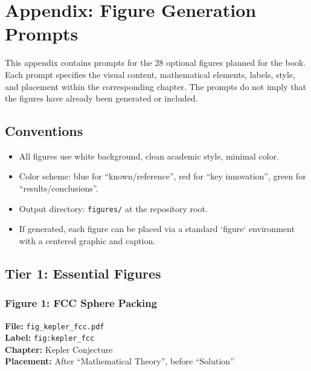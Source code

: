 \chapter*{Appendix: Figure Generation Prompts}

This appendix contains prompts for the 28 optional figures planned for the book. Each prompt specifies the visual content, mathematical elements, labels, style, and placement within the corresponding chapter. The prompts do not imply that the figures have already been generated or included.

\section*{Conventions}
\begin{itemize}
\item All figures use white background, clean academic style, minimal color.
\item Color scheme: blue for ``known/reference'', red for ``key innovation'', green for ``results/conclusions''.
\item Output directory: \texttt{figures/} at the repository root.
\item If generated, each figure can be placed via a standard `figure` environment with a centered graphic and caption.
\end{itemize}


\section*{Tier 1: Essential Figures}

\subsection*{Figure 1: FCC Sphere Packing}
\textbf{File:} \texttt{fig\_kepler\_fcc.pdf} \\
\textbf{Label:} \texttt{fig:kepler\_fcc} \\
\textbf{Chapter:} Kepler Conjecture \\
\textbf{Placement:} After ``Mathematical Theory'', before ``Solution''

